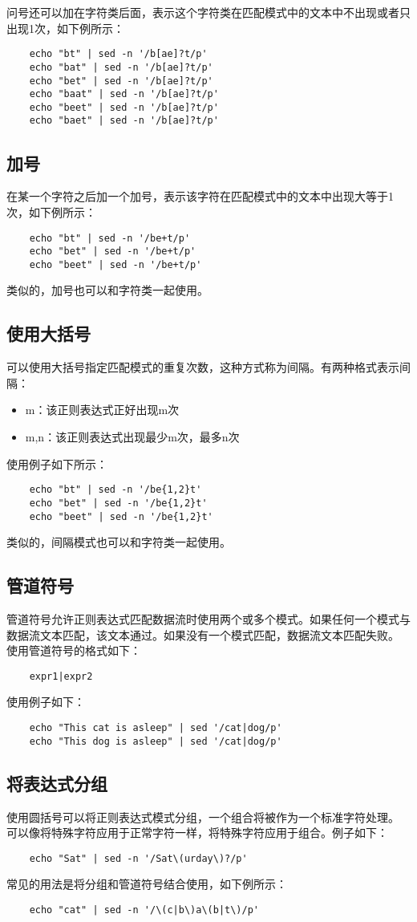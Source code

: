 \documentclass[a4paper,left=2.5cm,right=2.5cm,11pt]{article}
\begin{document}
	问号还可以加在字符类后面，表示这个字符类在匹配模式中的文本中不出现或者只出现1次，如下例所示：
	\begin{lstlisting}
	echo "bt" | sed -n '/b[ae]?t/p'
	echo "bat" | sed -n '/b[ae]?t/p'
	echo "bet" | sed -n '/b[ae]?t/p'
	echo "baat" | sed -n '/b[ae]?t/p'
	echo "beet" | sed -n '/b[ae]?t/p'
	echo "baet" | sed -n '/b[ae]?t/p'
	\end{lstlisting}

\subsection{加号}
	在某一个字符之后加一个加号，表示该字符在匹配模式中的文本中出现大等于1次，如下例所示：
	\begin{lstlisting}
	echo "bt" | sed -n '/be+t/p'
	echo "bet" | sed -n '/be+t/p'
	echo "beet" | sed -n '/be+t/p'
	\end{lstlisting}

	类似的，加号也可以和字符类一起使用。

\subsection{使用大括号}
	可以使用大括号指定匹配模式的重复次数，这种方式称为间隔。有两种格式表示间隔：
	\begin{itemize}
		\item m：该正则表达式正好出现m次
		\item m,n：该正则表达式出现最少m次，最多n次
	\end{itemize}

	使用例子如下所示：
	\begin{lstlisting}
	echo "bt" | sed -n '/be{1,2}t'
	echo "bet" | sed -n '/be{1,2}t'
	echo "beet" | sed -n '/be{1,2}t'
	\end{lstlisting}

	类似的，间隔模式也可以和字符类一起使用。

\subsection{管道符号}
	管道符号允许正则表达式匹配数据流时使用两个或多个模式。如果任何一个模式与数据流文本匹配，该文本通过。如果没有一个模式匹配，数据流文本匹配失败。
	使用管道符号的格式如下：
	\begin{lstlisting}
	expr1|expr2
	\end{lstlisting}

	使用例子如下：
	\begin{lstlisting}
	echo "This cat is asleep" | sed '/cat|dog/p'
	echo "This dog is asleep" | sed '/cat|dog/p'
	\end{lstlisting}

\subsection{将表达式分组}
	使用圆括号可以将正则表达式模式分组，一个组合将被作为一个标准字符处理。
	可以像将特殊字符应用于正常字符一样，将特殊字符应用于组合。例子如下：
	\begin{lstlisting}
	echo "Sat" | sed -n '/Sat\(urday\)?/p'
	\end{lstlisting}

	常见的用法是将分组和管道符号结合使用，如下例所示：
	\begin{lstlisting}
	echo "cat" | sed -n '/\(c|b\)a\(b|t\)/p'
	\end{lstlisting}
\end{document}

